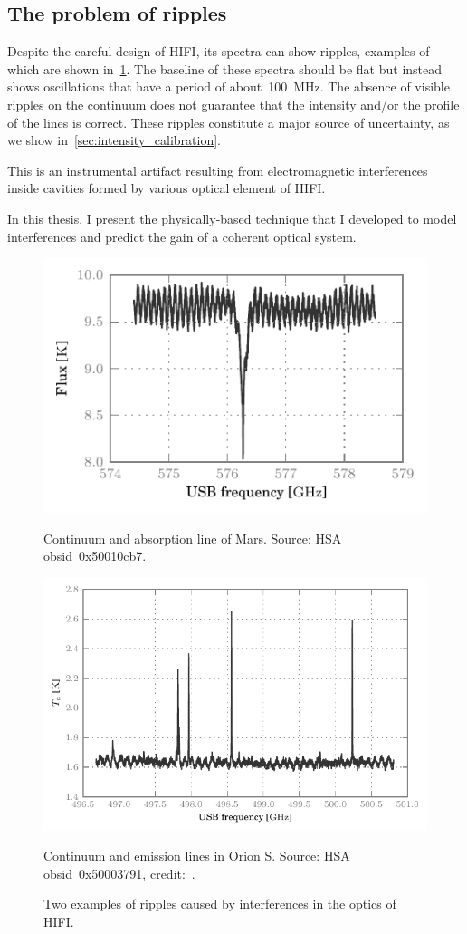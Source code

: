
\subsection{The problem of ripples}

Despite the careful design of HIFI,
its spectra can show ripples, examples of which are shown in~\cref{fig:ripples}.
The baseline of these spectra should be flat but instead shows oscillations that have a period of about~\SI{100}{\mega\hertz}.
The absence of visible ripples on the continuum does not guarantee that the intensity and/or the profile of the lines is correct.
These ripples constitute a major source of uncertainty, as we show in~\cref{sec:intensity_calibration}.

This is an instrumental artifact resulting from electromagnetic interferences inside cavities formed by various optical element of HIFI.

In this thesis, I present the physically-based technique that I developed to model interferences and predict the gain of a coherent optical system.

\begin{figure}[bp]
    \centering
    \includegraphics[width=.8\textwidth]{mars_50010cb7_WBSH_USB}
    \caption*{Continuum and absorption line of Mars.
              Source: HSA obsid~0x50010cb7.
    }
    \bigskip
    \includegraphics[width=.8\textwidth]{50003791_00}
    \caption*{Continuum and emission lines in Orion S.
       Source: HSA obsid~0x50003791, credit:~\textcite{goldsmith2011herschel}.}
    \caption{Two examples of ripples caused by interferences in the optics of HIFI.}
    \label{fig:ripples}
\end{figure}



